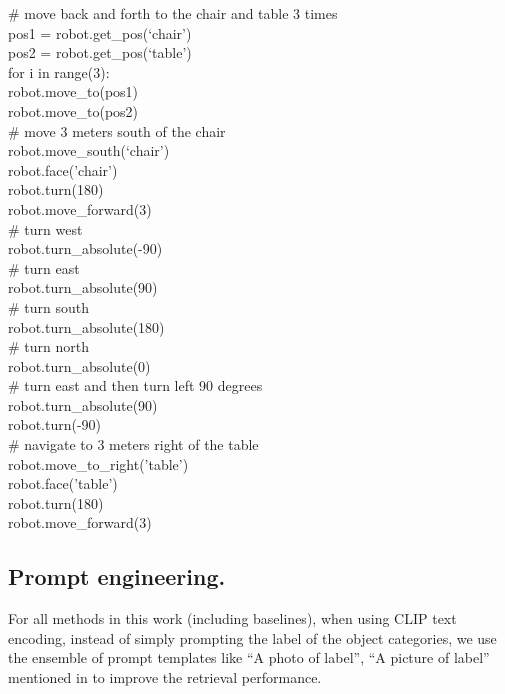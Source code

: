 \documentclass[letterpaper, 10 pt, conference]{ieeeconf}  %
\newcommand{\prompt}[1]{\textcolor{prompt-gray}{#1}}
\newcommand{\lmp}[1]{
\begin{tcolorbox}[boxsep=0pt,
                  left=3pt,
                  right=-4pt,
                  top=3pt,
                  bottom=3pt,
                  arc=0pt,
                  boxrule=0.5pt,
                  colframe=light-gray,
                  colback=white
                  ]
\small{  %
\ttfamily
#1
}
\end{tcolorbox}
}
\begin{document}
\lmp{
\prompt{
\# move back and forth to the chair and table 3 times\\
pos1 = robot.get\_pos(`chair')\\
pos2 = robot.get\_pos(`table')\\
for i in range(3):\\
\hspace*{4mm}robot.move\_to(pos1)\\
\hspace*{4mm}robot.move\_to(pos2)\\
\# move 3 meters south of the chair\\
robot.move\_south(`chair')\\
robot.face('chair')\\
robot.turn(180)\\
robot.move\_forward(3)\\
\# turn west\\
robot.turn\_absolute(-90)\\
\# turn east\\
robot.turn\_absolute(90)\\
\# turn south\\
robot.turn\_absolute(180)\\
\# turn north\\
robot.turn\_absolute(0)\\
\# turn east and then turn left 90 degrees \\
robot.turn\_absolute(90)\\
robot.turn(-90)\\
\# navigate to 3 meters right of the table\\
robot.move\_to\_right('table')\\
robot.face('table')\\
robot.turn(180)\\
robot.move\_forward(3)\\
}
}


\subsection{Prompt engineering.} For all methods in this work (including baselines), when using CLIP text encoding, instead of simply prompting the label of the object categories, we use the ensemble of prompt templates like ``A photo of {label}'', ``A picture of {label}'' mentioned in \cite{radford2021learning} to improve the retrieval performance. 
\end{document}
